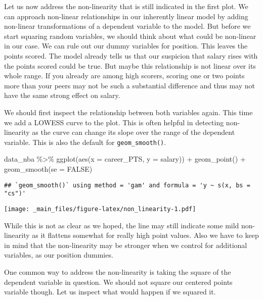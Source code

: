 \documentclass[
]{book}
\newenvironment{Shaded}{\begin{snugshade}}{\end{snugshade}}
\newcommand{\AttributeTok}[1]{\textcolor[rgb]{0.77,0.63,0.00}{#1}}
\newcommand{\ConstantTok}[1]{\textcolor[rgb]{0.00,0.00,0.00}{#1}}
\newcommand{\FunctionTok}[1]{\textcolor[rgb]{0.00,0.00,0.00}{#1}}
\newcommand{\NormalTok}[1]{#1}
\newcommand{\SpecialCharTok}[1]{\textcolor[rgb]{0.00,0.00,0.00}{#1}}
\begin{document}
Let us now address the non-linearity that is still indicated in the first plot.
We can approach non-linear relationships in our inherently linear model by
adding non-linear transformations of a dependent variable to the model. But
before we start squaring random variables, we should think about what could be
non-linear in our case. We can rule out our dummy variables for position. This
leaves the points scored. The model already tells us that our suspicion that
salary rises with the points scored could be true. But maybe this relationship
is not linear over its whole range. If you already are among high scorers,
scoring one or two points more than your peers may not be such a substantial
difference and thus may not have the same strong effect on salary.

We should first inspect the relationship between both variables again. This time
we add a LOWESS curve to the plot. This is often helpful in detecting
non-linearity as the curve can change its slope over the range of the dependent
variable. This is also the default for \texttt{geom\_smooth()}.

\begin{Shaded}
\begin{Highlighting}[]
\NormalTok{data\_nba }\SpecialCharTok{\%\textgreater{}\%} 
  \FunctionTok{ggplot}\NormalTok{(}\FunctionTok{aes}\NormalTok{(}\AttributeTok{x =}\NormalTok{ career\_PTS, }\AttributeTok{y =}\NormalTok{ salary)) }\SpecialCharTok{+}
  \FunctionTok{geom\_point}\NormalTok{() }\SpecialCharTok{+}
  \FunctionTok{geom\_smooth}\NormalTok{(}\AttributeTok{se =} \ConstantTok{FALSE}\NormalTok{)}
\end{Highlighting}
\end{Shaded}

\begin{verbatim}
## `geom_smooth()` using method = 'gam' and formula = 'y ~ s(x, bs = "cs")'
\end{verbatim}

\texttt{[image: \_main\_files/figure-latex/non\_linearity-1.pdf]}

While this is not as clear as we hoped, the line may still indicate some mild
non-linearity as it flattens somewhat for really high point values. Also we have
to keep in mind that the non-linearity may be stronger when we control for
additional variables, as our position dummies.

One common way to address the non-linearity is taking the square of the
dependent variable in question. We should not square our centered points
variable though. Let us inspect what would happen if we squared it.
\end{document}
